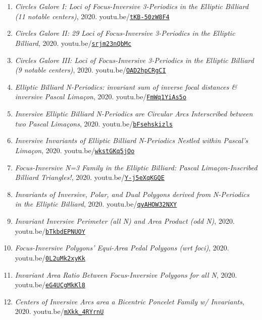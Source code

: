 \documentclass[12pt]{article}
\begin{document}
\begin{enumerate}[resume]
\item \textit{Circles Galore I: Loci of Focus-Inversive 3-Periodics in the Elliptic Billiard (11 notable centers)}, 2020. youtu.be/\href{https://youtu.be/tKB-50zW8F4}{\nolinkurl{tKB-50zW8F4}}
\item \textit{Circles Galore II: 29 Loci of Focus-Inversive 3-Periodics in the Elliptic Billiard}, 2020. youtu.be/\href{https://youtu.be/srjm23nQbMc}{\nolinkurl{srjm23nQbMc}}
\item \textit{Circles Galore III: Loci of Focus-Inversive 3-Periodics in the Elliptic Billiard (9 notable centers)}, 2020. youtu.be/\href{https://youtu.be/OAD2hpCRgCI}{\nolinkurl{OAD2hpCRgCI}}
\item \textit{Elliptic Billiard N-Periodics: invariant sum of inverse focal distances \& inversive Pascal Limaçon}, 2020. youtu.be/\href{https://youtu.be/FmWq1YiAs5o}{\nolinkurl{FmWq1YiAs5o}}
\item \textit{Inversive Elliptic Billiard N-Periodics are Circular Arcs Interscribed between two Pascal Limaçons}, 2020. youtu.be/\href{https://youtu.be/bFsehskizls}{\nolinkurl{bFsehskizls}}
\item \textit{Inversive Invariants of Elliptic Billiard N-Periodics Nestled within Pascal's Limaçon}, 2020. youtu.be/\href{https://youtu.be/wkstGKq5jOo}{\nolinkurl{wkstGKq5jOo}}
\item \textit{Focus-Inversive N=3 Family in the Elliptic Billiard: Pascal Limaçon-Inscribed Billiard Triangles!}, 2020. youtu.be/\href{https://youtu.be/Y-j5eXqKGQE}{\nolinkurl{Y-j5eXqKGQE}}
\item \textit{Invariants of Inversive, Polar, and Dual Polygons derived from N-Periodics in the Elliptic Billiard}, 2020. youtu.be/\href{https://youtu.be/qyAHOW32NXY}{\nolinkurl{qyAHOW32NXY}}
\item \textit{Invariant Inversive Perimeter (all N) and Area Product (odd N)}, 2020. youtu.be/\href{https://youtu.be/bTkbdEPNUOY}{\nolinkurl{bTkbdEPNUOY}}
\item \textit{Focus-Inversive Polygons' Equi-Area Pedal Polygons (wrt foci)}, 2020. youtu.be/\href{https://youtu.be/0L2uMk2xyKk}{\nolinkurl{0L2uMk2xyKk}}
\item \textit{Invariant Area Ratio Between Focus-Inversive Polygons for all N}, 2020. youtu.be/\href{https://youtu.be/eG4UCgMkKl8}{\nolinkurl{eG4UCgMkKl8}}
\item \textit{Centers of Inversive Arcs area a Bicentric Poncelet Family w/ Invariants}, 2020. youtu.be/\href{https://youtu.be/mXkk_4RYrnU}{\nolinkurl{mXkk\_4RYrnU}}

\end{enumerate}
\end{document}
